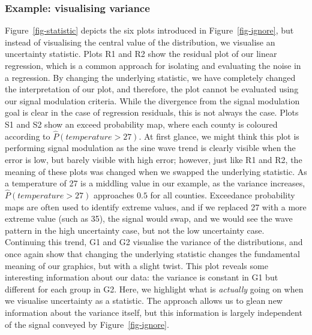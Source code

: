 \documentclass[]{ar-1col-S2O}
\begin{document}
\subsubsection{Example: visualising
variance}\label{example-visualising-variance}

Figure~\ref{fig-statistic} depicts the six plots introduced in
Figure~\ref{fig-ignore}, but instead of visualising the central value of
the distribution, we visualise an uncertainty statistic. Plots R1 and R2
show the residual plot of our linear regression, which is a common
approach for isolating and evaluating the noise in a regression. By
changing the underlying statistic, we have completely changed the
interpretation of our plot, and therefore, the plot cannot be evaluated
using our signal modulation criteria. While the divergence from the
signal modulation goal is clear in the case of regression residuals,
this is not always the case. Plots S1 and S2 show an exceed probability
map, where each county is coloured according to
\(\widehat{P}(temperature>27)\). At first glance, we might think this
plot is performing signal modulation as the sine wave trend is clearly
visible when the error is low, but barely visible with high error;
however, just like R1 and R2, the meaning of these plots was changed
when we swapped the underlying statistic. As a temperature of 27 is a
middling value in our example, as the variance increases,
\(\widehat{P}(temperature>27)\) approaches \(0.5\) for all counties.
Exceedance probability maps are often used to identify extreme values,
and if we replaced 27 with a more extreme value (such as 35), the signal
would swap, and we would see the wave pattern in the high uncertainty
case, but not the low uncertainty case. Continuing this trend, G1 and G2
visualise the variance of the distributions, and once again show that
changing the underlying statistic changes the fundamental meaning of our
graphics, but with a slight twist. This plot reveals some interesting
information about our data: the variance is constant in G1 but different
for each group in G2. Here, we highlight what is \emph{actually} going
on when we visualise uncertainty as a statistic. The approach allows us
to glean new information about the variance itself, but this information
is largely independent of the signal conveyed by
Figure~\ref{fig-ignore}.
\end{document}
